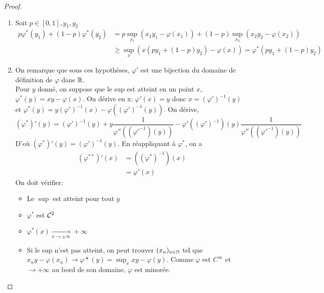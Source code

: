 \documentclass[]{report}
\begin{document}
    \begin{proof}
        \begin{enumerate}
            \item Soit $p\in [0,1],y_1,y_2$
            \begin{align*}
                p\varphi^*(y_1)+(1-p)\varphi^*(y_2)&=p\sup_{x_1}(x_1 y_1-\varphi(x_1))+(1-p)\sup_{x_2}(x_2y_2-\varphi(x_2))\\
                &\ge \sup_x\left(x(py_1+(1-p)y_2)-\varphi(x)\right)=\varphi^*(py_1+(1-p)y_2)
            \end{align*}
            \item On remarque que sous ces hypothèses, $\varphi'$ est une bijection du domaine de définition de $\varphi$ dans $\mathbb{R}$.\\
            Pour $y$ donné, on suppose que le sup est atteint en un point $x$, $\varphi^*(y)=xy-\varphi(x)$. On dérive en x: $\varphi'(x)=y$ donc $x=(\varphi')^{-1}(y)$ et $\varphi^*(y)=y\left(\varphi'\right)^{-1}(x)-\varphi\left((\varphi')^{-1} (y)\right)$. On dérive,
            \[\left(\varphi^*\right)'(y)=\left(\varphi'\right)^{-1}(y)+y\frac{1}{\varphi''\left((\varphi'^{-1})(y)\right)}-\varphi'\left((\varphi')^{-1}\right)(y)\frac{1}{\varphi''\left((\varphi'^{-1})(y)\right)}\]
            D'où $(\varphi^*)'(y)=\left(\varphi'\right)^{-1}(y)$. En réappliquant à $\varphi^*$, on a
            \begin{align*}
                \left(\varphi^{**}\right)'(x)&=\left(\left(\varphi^*\right)^{-1}\right)(x)\\
                &=\varphi'(x)
            \end{align*}
            On doit vérifier:
            \begin{itemize}
                \item Le $\sup$ est atteint pour tout $y$
                \item $\varphi^*$ est $\mathcal{C}^2$
                \item $\displaystyle{\varphi^*(x) \underset{x\to \pm \infty}{\longrightarrow} +\infty}$
            \end{itemize}
            \vspace{0.5cm}
            \begin{itemize}
                \item Si le sup n'est pas atteint, on peut trouver $(x_n)_{n\in\mathbb{N}}$ tel que $x_n y-\varphi(x_n)\to \varphi*(y)=\sup_x xy-\varphi(y)$. Comme $\varphi$ est $C^\infty$ et $\to +\infty$ au bord de son domaine, $\varphi$ est minorée.\\

\end{itemize}
\end{enumerate}
\end{proof}
\end{document}
